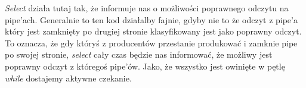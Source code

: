 \textit{Select} działa tutaj tak, że informuje nas o możliwości poprawnego odczytu na pipe'ach. Generalnie to ten kod działalby fajnie, gdyby nie to że odczyt z pipe'a który jest zamknięty po drugiej stronie klasyfikowany jest jako poprawny odczyt. To oznacza, że gdy któryś z producentów przestanie produkować i zamknie pipe po swojej stronie, \textit{select} cały czas będzie nas informować, że możliwy jest poprawny odczyt z któregoś pipe'ów. Jako, że wszystko jest owinięte w pętlę \textit{while} dostajemy aktywne czekanie. 